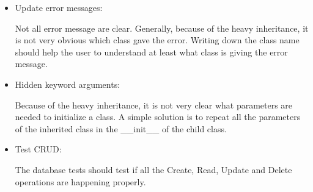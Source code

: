 \documentclass[a4paper,10pt,english]{sphinxmanual}
\begin{document}
\begin{itemize}
\item {} 
Update error messages:

Not all error message are clear. Generally, because of the heavy
inheritance, it is not very obvious which class gave the error. Writing down
the class name should help the user to understand at least what class is
giving the error message.

\item {} 
Hidden keyword arguments:

Because of the heavy inheritance, it is not very clear what parameters are
needed to initialize a class. A simple solution is to repeat all the
parameters of the inherited class in the \_\_init\_\_ of the child class.

\item {} 
Test CRUD:

The database tests should test if all the Create, Read, Update and Delete
operations are happening properly.

\end{itemize}
\end{document}

